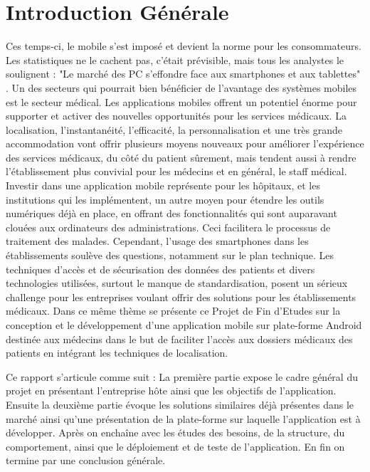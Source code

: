 
\chapter*{Introduction Générale}

Ces temps-ci, le mobile s’est imposé et devient la norme pour les consommateurs.
Les statistiques ne le cachent pas, c’était prévisible, mais tous les analystes
le soulignent : "Le marché des PC s’effondre face aux smartphones et aux
tablettes" \cite{venturebeat.com}. Un des secteurs qui pourrait bien bénéficier
de l’avantage des systèmes mobiles est le secteur médical. Les applications
mobiles offrent un potentiel énorme pour supporter et activer des nouvelles
opportunités pour les services médicaux. La localisation, l’instantanéité,
l’efficacité, la personnalisation et une très grande accommodation vont offrir
plusieurs moyens nouveaux pour améliorer l’expérience des services médicaux, du
côté du patient sûrement, mais tendent aussi à rendre l’établissement plus
convivial pour les médecins et en général, le staff médical. Investir dans une
application mobile représente pour les hôpitaux, et les institutions qui les
implémentent, un autre moyen pour étendre les outils numériques déjà en place,
en offrant des fonctionnalités qui sont auparavant clouées  aux ordinateurs des
administrations. Ceci facilitera le processus de traitement des malades.
Cependant, l’usage des smartphones dans les établissements soulève des
questions, notamment sur le plan technique. Les techniques d’accès et de
sécurisation des données des patients et divers technologies utilisées, surtout
le manque de standardisation, posent un sérieux challenge pour les entreprises
voulant offrir des solutions pour les établissements médicaux. Dans ce même
thème se présente ce Projet de Fin d’Etudes sur la conception et le
développement d’une application mobile sur plate-forme Android destinée aux
médecins dans le but de faciliter l’accès aux dossiers médicaux des patients en
intégrant les techniques de localisation.

Ce rapport s'articule comme suit : La première partie expose le cadre
général du projet en présentant l’entreprise hôte ainsi que les objectifs de
l’application. Ensuite la deuxième partie évoque les solutions similaires déjà présentes
dans le marché ainsi qu’une présentation de la plate-forme sur laquelle
l’application est à développer. Après on enchaîne avec les études des besoins, de la structure, du comportement, ainsi que le déploiement et de teste de l'application. En fin on termine par une conclusion générale.

